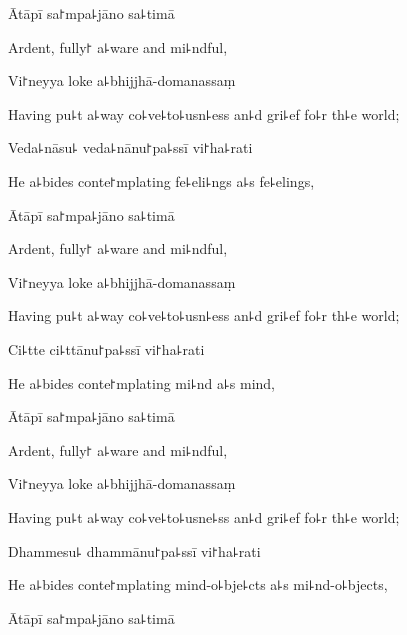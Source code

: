 Ātāpī sa꜓mpa꜕jāno sa꜕timā

\begin{english}
  Ardent, fully꜓ a꜕ware and mi꜕ndful,
\end{english}

Vi꜓neyya loke a꜕bhijjhā-domanassaṃ

\begin{english}
  Having pu꜕t a꜕way co꜕ve꜕to꜕usn꜕ess an꜕d gri꜕ef fo꜕r th꜕e world;
\end{english}

Veda꜕nāsu꜕ veda꜕nānu꜓pa꜕ssī vi꜓ha꜕rati

\begin{english}
  He a꜕bides conte꜓mplating fe꜕eli꜕ngs a꜕s fe꜕elings,
\end{english}

\ifaivedition
\clearpage
\fi

Ātāpī sa꜓mpa꜕jāno sa꜕timā

\begin{english}
  Ardent, fully꜓ a꜕ware and mi꜕ndful,
\end{english}

Vi꜓neyya loke a꜕bhijjhā-domanassaṃ

\begin{english}
  Having pu꜕t a꜕way co꜕ve꜕to꜕usn꜕ess an꜕d gri꜕ef fo꜕r th꜕e world;
\end{english}

Ci꜕tte ci꜕ttānu꜓pa꜕ssī vi꜓ha꜕rati

\begin{english}
  He a꜕bides conte꜓mplating mi꜕nd a꜕s mind,
\end{english}

Ātāpī sa꜓mpa꜕jāno sa꜕timā

\begin{english}
  Ardent, fully꜓ a꜕ware and mi꜕ndful,
\end{english}

Vi꜓neyya loke a꜕bhijjhā-domanassaṃ

\begin{english}
  Having pu꜕t a꜕way co꜕ve꜕to꜕usne꜕ss an꜕d gri꜕ef fo꜕r th꜕e world;
\end{english}

Dhammesu꜕ dhammānu꜓pa꜕ssī vi꜓ha꜕rati

\begin{english}
  He a꜕bides conte꜓mplating mind-o꜕bje꜕cts a꜕s mi꜕nd-o꜕bjects,
\end{english}

Ātāpī sa꜓mpa꜕jāno sa꜕timā

